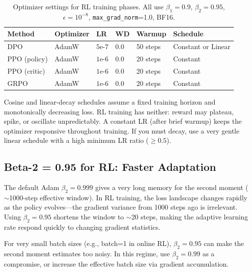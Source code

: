 \begin{table}[ht!]
\centering
\caption{Optimizer settings for RL training phases. All use $\beta_1=0.9$, $\beta_2=0.95$, $\epsilon=10^{-8}$, \texttt{max\_grad\_norm}=1.0, BF16.}
{\footnotesize
\begin{tabular}{@{}llllll@{}}
\toprule
\textbf{Method} & \textbf{Optimizer} & \textbf{LR} & \textbf{WD} & \textbf{Warmup} & \textbf{Schedule} \\
\midrule
DPO & AdamW & $5\text{e-}7$ & 0.0 & 50 steps & Constant or Linear \\
PPO (policy) & AdamW & $1\text{e-}6$ & 0.0 & 20 steps & Constant \\
PPO (critic) & AdamW & $1\text{e-}6$ & 0.0 & 20 steps & Constant \\
GRPO & AdamW & $1\text{e-}6$ & 0.0 & 20 steps & Constant \\
\bottomrule
\end{tabular}
}
\end{table}

\begin{intuitionbox}
Cosine and linear-decay schedules assume a fixed training horizon and monotonically decreasing loss. RL training has neither: reward may plateau, spike, or oscillate unpredictably. A constant LR (after brief warmup) keeps the optimizer responsive throughout training. If you must decay, use a very gentle linear schedule with a high minimum LR ratio ($\geq 0.5$).
\end{intuitionbox}

\subsection{Beta-2 = 0.95 for RL: Faster Adaptation}
\label{beta-2-0.95-for-rl-faster-adaptation}

The default Adam $\beta_2 = 0.999$ gives a very long memory for the second moment ($\sim$1000-step effective window). In RL training, the loss landscape changes rapidly as the policy evolves---the gradient variance from 1000 steps ago is irrelevant. Using $\beta_2 = 0.95$ shortens the window to $\sim$20 steps, making the adaptive learning rate respond quickly to changing gradient statistics.

\begin{warningbox}[When beta2 = 0.95 Hurts]
For very small batch sizes (e.g., batch=1 in online RL), $\beta_2 = 0.95$ can make the second moment estimates too noisy. In this regime, use $\beta_2 = 0.99$ as a compromise, or increase the effective batch size via gradient accumulation.
\end{warningbox}

